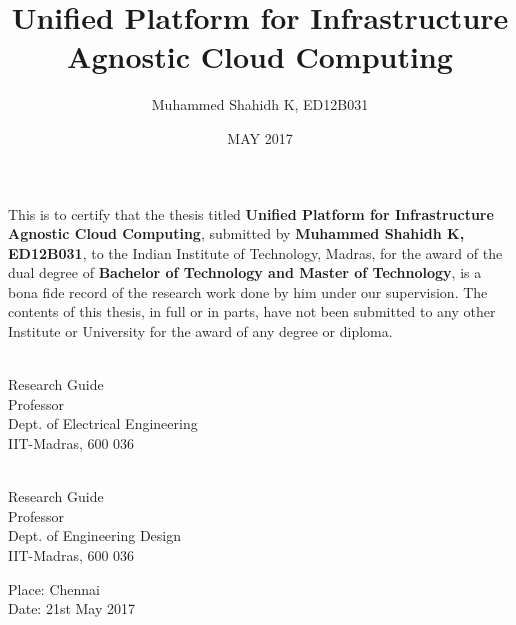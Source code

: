 \documentclass[DD]{iitmdiss}
\begin{document}

\title{Unified Platform for Infrastructure Agnostic Cloud Computing}

\author{Muhammed Shahidh K, ED12B031}

\date{MAY 2017}

\maketitle

\certificate

\vspace*{0.5in}

\noindent This is to certify that the thesis titled {\bf Unified Platform for Infrastructure Agnostic Cloud Computing}, submitted by {\bf Muhammed Shahidh K, ED12B031}, 
  to the Indian Institute of Technology, Madras, for
the award of the dual degree of {\bf Bachelor of Technology and Master of Technology}, is a bona fide
record of the research work done by him under our supervision.  The
contents of this thesis, in full or in parts, have not been submitted
to any other Institute or University for the award of any degree or
diploma.

\vspace*{1.5in}

\begin{singlespacing}
\hspace*{-0.25in}
\parbox{2.5in}{
 \\
\noindent Research Guide \\ 
\noindent Professor \\
\noindent Dept. of Electrical Engineering\\
\noindent IIT-Madras, 600 036 \\
} 
\hspace*{1.0in} 
\parbox{2.5in}{
 \\
\noindent Research Guide \\ 
\noindent Professor \\
\noindent Dept. of Engineering Design\\
\noindent IIT-Madras, 600 036 \\
}  
\end{singlespacing}
\vspace*{0.25in}
\noindent Place: Chennai\\
Date: 21st May 2017 
\end{document}
